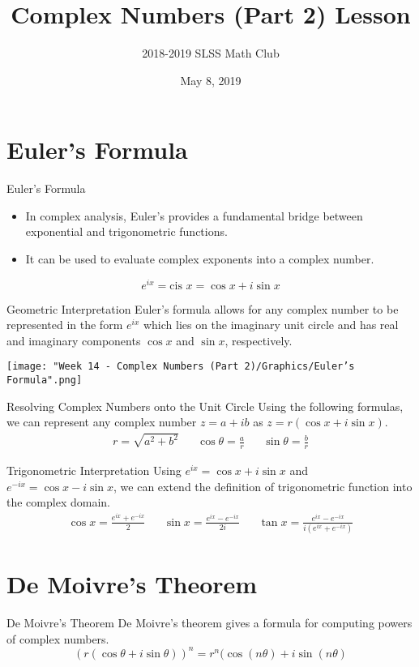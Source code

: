 \documentclass{beamer}
\title{Complex Numbers (Part 2) Lesson}
\author{2018-2019 SLSS Math Club}
\date{May 8, 2019}
\begin{document}
\frame{\titlepage}

\section{Euler's Formula}
\begin{frame}{Euler's Formula}
\begin{itemize}
    \item In complex analysis, Euler's provides a fundamental bridge between exponential and trigonometric functions. 
    \item It can be used to evaluate complex exponents into a complex number.
\end{itemize}

\begin{equation*}
    e^{ix} = \text{cis } x = \cos{x} + i\sin{x}
\end{equation*}
\end{frame}

\begin{frame}{Geometric Interpretation}
Euler's formula allows for any complex number to be represented in the form $e^{ix}$ which lies on the imaginary unit circle and has real and imaginary components $\cos{x}$ and $\sin{x}$, respectively.

\begin{center}
    \texttt{[image: "Week 14 - Complex Numbers (Part 2)/Graphics/Euler's Formula".png]}
\end{center}
\end{frame}

\begin{frame}{Resolving Complex Numbers onto the Unit Circle}
Using the following formulas, we can represent any complex number $z = a + ib$ as $z = r(\cos{x} + i\sin{x})$.
\begin{align*}
    r = \sqrt{a^2 + b^2} && \cos{\theta} = \frac{a}{r} && \sin{\theta} = \frac{b}{r}
\end{align*}
\end{frame}

\begin{frame}{Trigonometric Interpretation}
Using $e^{ix} =  \cos{x} + i\sin{x}$ and $e^{-ix} =  \cos{x} - i\sin{x}$, we can extend the definition of trigonometric function into the complex domain.
\begin{align*}
    \cos{x} = \frac{e^{ix} +e^{-ix}}{2} && \sin{x} = \frac{e^{ix} - e^{-ix}}{2i} && \tan{x} = \frac{e^{ix} - e^{-ix}}{i(e^{ix} +e^{-ix})}
\end{align*}
\end{frame}

\section{De Moivre's Theorem}
\begin{frame}{De Moivre's Theorem}
    De Moivre’s theorem gives a formula for computing powers of complex numbers.
    \begin{equation*}
        (r(\cos{\theta} + i\sin{\theta}))^n = r^n(\cos{(n\theta) + i\sin(n\theta)}
    \end{equation*}
\end{frame}
\end{document}
